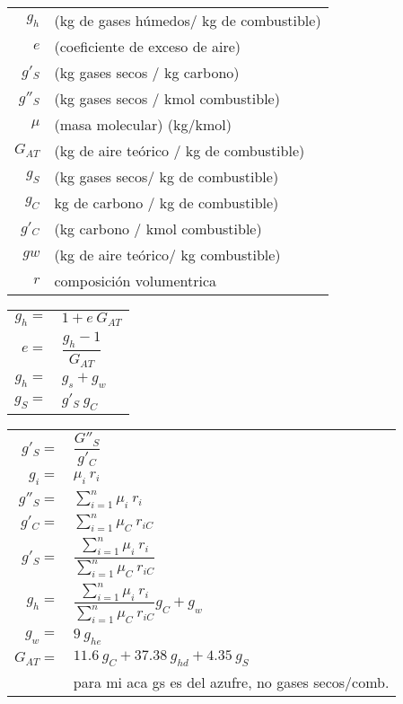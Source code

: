 \documentclass[11pt,a4paper]{article}
\begin{document}
	\begin{cajita}
		\begin{multicols}{2}
			\begin{tabular}{r p{}}
				$g_{h}$ & (kg de gases húmedos/ kg de combustible)\\
				$e$ & (coeficiente de exceso de aire)\\
				$g'_{S}$ & (kg gases secos / kg carbono)\\
				$g''_{S}$ & (kg gases secos / kmol combustible)\\
				$\mu$ & (masa molecular) (kg/kmol)\\
				$G_{AT}$ & (kg de aire teórico / kg de combustible)\\
				$g_{S}$ & (kg gases secos/ kg de combustible)\\
				$g_{C}$ & kg de carbono / kg de combustible)\\
				$g'_{C}$ & (kg carbono / kmol combustible)\\
				$g{w}$ & (kg de aire teórico/ kg combustible)\\
				$r$ & composición volumentrica\\
				
			\end{tabular}
			\begin{tabular}{r l }
			$g_{h}=$&$1+e~G_{AT}$\\[0.2cm]
			$e=$&$\dfrac{g_{h}-1}{G_{AT}}$\\
			$g_{h}=$&$g_{s}+g_{w}$\\
			$g_{S}=$&$g'_{S}~g_{C}$\\
			\end{tabular}
			\begin{tabular}{r l }
				$g'_{S}=$&$\dfrac{G''_{S}}{g'_{C}}$\\
				$g_{i}=$&$\mu_{i}~r_{i}$\\[0.3cm]
				$g''_{S}=$&$\displaystyle \sum_{i=1}^{n} \mu_{i}~r_{i}$\\[0.3cm]
				$g'_{C}=$&$\displaystyle \sum_{i=1}^{n} \mu_{C}~r_{iC}$\\[0.3cm]
				$g'_{S}=$&$\dfrac{\sum_{i=1}^{n} \mu_{i}~r_{i}}{\sum_{i=1}^{n} \mu_{C}~r_{iC}}$\\[0.3cm]
				$g_{h}=$&$\dfrac{\sum_{i=1}^{n} \mu_{i}~r_{i}}{\sum_{i=1}^{n} \mu_{C}~r_{iC}} g_{C}+g_{w}$\\[0.35cm]
				$g_{w}=$&$9~g_{he}$\\[0.1cm]
				$G_{AT}=$&$11.6~g_{C}+37.38~g_{hd}+4.35~g_{S}$\\
				&\tiny{para mi aca gs es del azufre, no gases secos/comb.}
			\end{tabular}
					
			
		\end{multicols}
	\end{cajita}
\end{document}
